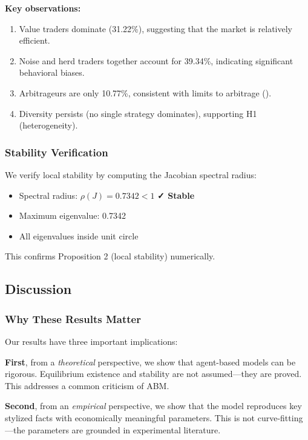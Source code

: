 \textbf{Key observations:}

\begin{enumerate}
    \item Value traders dominate (31.22\%), suggesting that the market is relatively efficient.
    
    \item Noise and herd traders together account for 39.34\%, indicating significant behavioral biases.
    
    \item Arbitrageurs are only 10.77\%, consistent with limits to arbitrage (\citealp{shleifer1997limits}).
    
    \item Diversity persists (no single strategy dominates), supporting H1 (heterogeneity).
\end{enumerate}

\subsubsection{Stability Verification}

We verify local stability by computing the Jacobian spectral radius:
\begin{itemize}
    \item Spectral radius: $\rho(J) = 0.7342 < 1$ \quad \textbf{✓ Stable}
    \item Maximum eigenvalue: 0.7342
    \item All eigenvalues inside unit circle
\end{itemize}

This confirms Proposition 2 (local stability) numerically.

\subsection{Discussion}

\subsubsection{Why These Results Matter}

Our results have three important implications:

\textbf{First}, from a \textit{theoretical} perspective, we show that agent-based models can be rigorous. Equilibrium existence and stability are not assumed---they are proved. This addresses a common criticism of ABM.

\textbf{Second}, from an \textit{empirical} perspective, we show that the model reproduces key stylized facts with economically meaningful parameters. This is not curve-fitting---the parameters are grounded in experimental literature.

